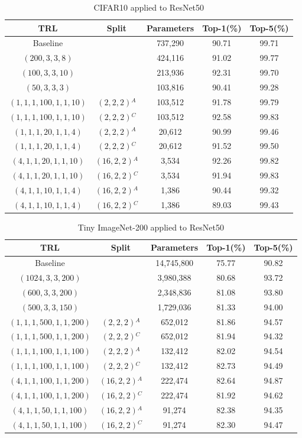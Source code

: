 \documentclass{article}
\begin{document}
\begin{table}
	\caption{CIFAR10 applied to ResNet50}
	\label{atab-2}
	\centering
	\begin{tabular}{c c c c c}
		\toprule
		\textbf{TRL} & \textbf{Split} & \textbf{Parameters} & \textbf{Top-1(\%)} & \textbf{Top-5(\%)} \\
		\midrule
		Baseline & & 737,290 & 90.71 & 99.71 \\
		$(200,3,3,8)$ & & 424,116 & 91.02 & 99.77 \\
		$(100,3,3,10)$ & & 213,936 & 92.31 & 99.70 \\
		$(50,3,3,3)$ & & 103,816 & 90.41 & 99.28 \\
		$(1,1,1,100,1,1,10)$ & $(2,2,2)$$^A$ & 103,512 & 91.78 & 99.79 \\
		$(1,1,1,100,1,1,10)$ & $(2,2,2)$$^C$ & 103,512 & 92.58 & 99.83 \\
		$(1,1,1,20,1,1,4)$ & $(2,2,2)$$^A$ & 20,612 & 90.99 & 99.46 \\
		$(1,1,1,20,1,1,4)$ & $(2,2,2)$$^C$ & 20,612 & 91.52 & 99.50 \\
		$(4,1,1,20,1,1,10)$ & $(16,2,2)$$^A$ & 3,534 & 92.26 & 99.82 \\
		$(4,1,1,20,1,1,10)$ & $(16,2,2)$$^C$ & 3,534 & 91.94 & 99.83 \\
		$(4,1,1,10,1,1,4)$ & $(16,2,2)$$^A$ & 1,386 & 90.44 & 99.32 \\
		$(4,1,1,10,1,1,4)$ & $(16,2,2)$$^C$ & 1,386 & 89.03 & 99.43 \\
		\hline
	\end{tabular}
\end{table}
\begin{table}
	\caption{Tiny ImageNet-200 applied to ResNet50}
	\label{atab-3}
	\centering
	\begin{tabular}{c c c c c}
		\toprule
		\textbf{TRL} & \textbf{Split} & \textbf{Parameters} & \textbf{Top-1(\%)} & \textbf{Top-5(\%)} \\
		\midrule
		Baseline & & 14,745,800 & 75.77 & 90.82 \\
		$(1024,3,3,200)$ & & 3,980,388 & 80.68 & 93.72 \\
		$(600,3,3,200)$ & & 2,348,836 & 81.08 & 93.80 \\
		$(500,3,3,150)$ & & 1,729,036 & 81.33 & 94.00 \\
		$(1,1,1,500,1,1,200)$ & $(2,2,2)$$^A$ & 652,012 & 81.86 & 94.57 \\
		$(1,1,1,500,1,1,200)$ & $(2,2,2)$$^C$ & 652,012 & 81.94 & 94.32 \\
		$(1,1,1,100,1,1,100)$ & $(2,2,2)$$^A$ & 132,412 & 82.02 & 94.54 \\
		$(1,1,1,100,1,1,100)$ & $(2,2,2)$$^C$ & 132,412 & 82.73 & 94.49 \\
		$(4,1,1,100,1,1,200)$ & $(16,2,2)$$^A$ & 222,474 & 82.64 & 94.87 \\
		$(4,1,1,100,1,1,200)$ & $(16,2,2)$$^C$ & 222,474 & 81.92 & 94.62 \\
		$(4,1,1,50,1,1,100)$ & $(16,2,2)$$^A$ & 91,274 & 82.38 & 94.35 \\
		$(4,1,1,50,1,1,100)$ & $(16,2,2)$$^C$ & 91,274 & 82.30 & 94.47 \\
		\hline
	\end{tabular}
\end{table}
\end{document}
